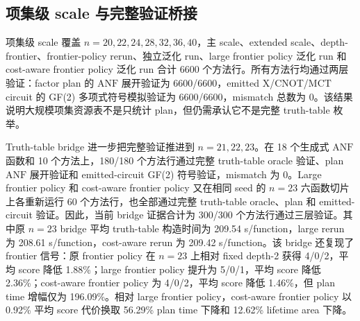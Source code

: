 \documentclass[UTF8,fontset=macnew,11pt]{ctexart}
\newcommand{\anf}{\ensuremath{\mathrm{ANF}}}
\newcommand{\ttable}{truth-table}
\newcommand{\mct}{\ensuremath{\mathrm{MCT}}}
\begin{document}
\subsection{项集级 scale 与完整验证桥接}

项集级 scale 覆盖 $n=20,22,24,28,32,36,40$，主 scale、extended scale、depth-frontier、frontier-policy rerun、独立泛化 run、large frontier policy 泛化 run 和 cost-aware frontier policy 泛化 run 合计 6600 个方法行。所有方法行均通过两层验证：factor plan 的 \anf{} 展开验证为 6600/6600，emitted X/CNOT/\mct{} circuit 的 GF(2) 多项式符号模拟验证为 6600/6600，mismatch 总数为 0。该结果说明大规模项集资源表不是只统计 plan，但仍需承认它不是完整 \ttable{} 枚举。

Truth-table bridge 进一步把完整验证推进到 $n=21,22,23$。在 18 个生成式 \anf{} 函数和 10 个方法上，180/180 个方法行通过完整 \ttable{} oracle 验证、plan \anf{} 展开验证和 emitted-circuit GF(2) 符号验证，mismatch 为 0。Large frontier policy 和 cost-aware frontier policy 又在相同 seed 的 $n=23$ 六函数切片上各重新运行 60 个方法行，也全部通过完整 \ttable{} oracle、plan 和 emitted-circuit 验证。因此，当前 bridge 证据合计为 300/300 个方法行通过三层验证。其中原 $n=23$ bridge 平均 truth-table 构造时间为 209.54 s/function，large rerun 为 208.61 s/function，cost-aware rerun 为 209.42 s/function。该 bridge 还复现了 frontier 信号：原 frontier policy 在 $n=23$ 上相对 fixed depth-2 获得 4/0/2，平均 score 降低 1.88\%；large frontier policy 提升为 5/0/1，平均 score 降低 2.36\%；cost-aware frontier policy 为 4/0/2，平均 score 降低 1.46\%，但 plan time 增幅仅为 196.09\%。相对 large frontier policy，cost-aware frontier policy 以 0.92\% 平均 score 代价换取 56.29\% plan time 下降和 12.62\% lifetime area 下降。
\end{document}
